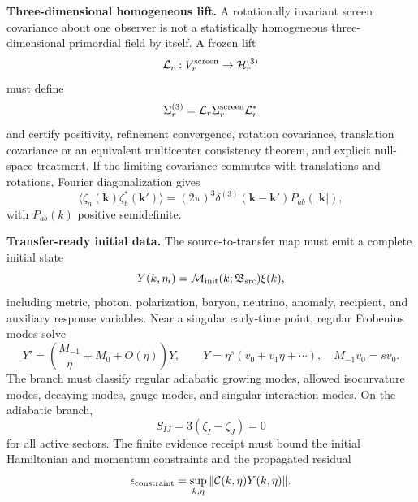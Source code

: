 \textbf{Three-dimensional homogeneous lift.}\label{par:three-d-lift}
A rotationally invariant screen covariance about one observer is not a
statistically homogeneous three-dimensional primordial field by itself.  A frozen lift
\[
\mathcal L_r:V_r^{\rm screen}\to\mathcal H_r^{(3)}
\]
must define
\[
\Sigma_r^{(3)}=\mathcal L_r\Sigma_r^{\rm screen}\mathcal L_r^\ast
\]
and certify positivity, refinement convergence, rotation covariance,
translation covariance or an equivalent multicenter consistency theorem, and
explicit null-space treatment.  If the limiting covariance commutes with
translations and rotations, Fourier diagonalization gives
\[
\langle \zeta_a(\mathbf k)\zeta_b^\ast(\mathbf k')\rangle
=(2\pi)^3\delta^{(3)}(\mathbf k-\mathbf k')P_{ab}(|\mathbf k|),
\]
with \(P_{ab}(k)\) positive semidefinite.

\textbf{Transfer-ready initial data.}\label{par:transfer-ready-initial-data}
The source-to-transfer map must emit a complete initial state
\[
Y(k,\eta_i)=\mathcal M_{\rm init}(k;\mathfrak B_{\rm src})\xi(k),
\]
including metric, photon, polarization, baryon, neutrino, anomaly, recipient,
and auxiliary response variables.  Near a singular early-time point, regular
Frobenius modes solve
\[
Y'=\left(\frac{M_{-1}}{\eta}+M_0+O(\eta)\right)Y,\qquad
Y=\eta^s(v_0+v_1\eta+\cdots),\quad M_{-1}v_0=sv_0.
\]
The branch must classify regular adiabatic growing modes, allowed isocurvature
modes, decaying modes, gauge modes, and singular interaction modes.  On the
adiabatic branch,
\[
S_{IJ}=3(\zeta_I-\zeta_J)=0
\]
for all active sectors.  The finite evidence receipt must bound the initial
Hamiltonian and momentum constraints and the propagated residual
\[
\epsilon_{\rm constraint}=\sup_{k,\eta}\|\mathcal C(k,\eta)Y(k,\eta)\|.
\]
